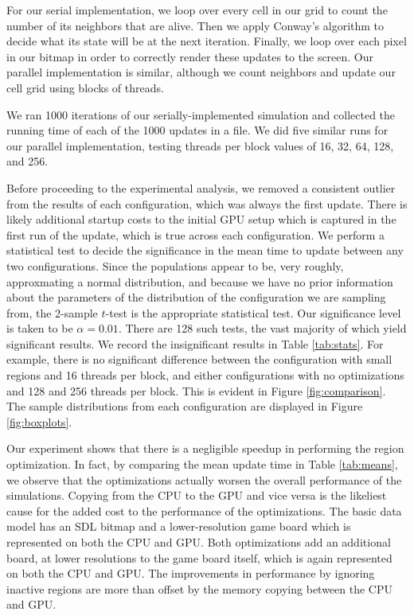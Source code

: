 \documentclass[onecolumn,12pt]{IEEEtran}
\begin{document}
For our serial implementation, we loop over every cell in our grid to count the
number of its neighbors that are alive. Then we apply Conway's algorithm to
decide what its state will be at the next iteration. Finally, we loop over each
pixel in our bitmap in order to correctly render these updates to the screen.
Our parallel implementation is similar, although we count neighbors and update
our cell grid using blocks of threads. 

We ran 1000 iterations of our serially-implemented simulation and collected the
running time of each of the 1000 updates in a file. We did five similar runs
for our parallel implementation, testing threads per block values of 16, 32,
64, 128, and 256.

Before proceeding to the experimental analysis, we removed a consistent outlier
from the results of each configuration, which was always the first update.
There is likely additional startup costs to the initial GPU setup which is
captured in the first run of the update, which is true across each
configuration. We perform a statistical test to decide the significance in the
mean time to update between any two configurations. Since the populations
appear to be, very roughly, approxmating a normal distribution, and because we
have no prior information about the parameters of the distribution of the
configuration we are sampling from, the 2-sample $t$-test is the appropriate
statistical test. Our significance level is taken to be $\alpha = 0.01$. There
are 128 such tests, the vast majority of which yield significant results. We
record the insignificant results in Table \ref{tab:stats}. For example, there
is no significant difference between the configuration with small regions and
16 threads per block, and either configurations with no optimizations and 128
and 256 threads per block.  This is evident in Figure \ref{fig:comparison}. The
sample distributions from each configuration are displayed in Figure
\ref{fig:boxplots}.

Our experiment shows that there is a negligible speedup in performing the
region optimization. In fact, by comparing the mean update time in Table
\ref{tab:means}, we observe that the optimizations actually worsen the overall
performance of the simulations. Copying from the CPU to the GPU and vice versa
is the likeliest cause for the added cost to the performance of the
optimizations. The basic data model has an SDL bitmap and a lower-resolution
game board which is represented on both the CPU and GPU.  Both optimizations
add an additional board, at lower resolutions to the game board itself, which
is again represented on both the CPU and GPU. The improvements in performance
by ignoring inactive regions are more than offset by the memory copying between
the CPU and GPU.
\end{document}
